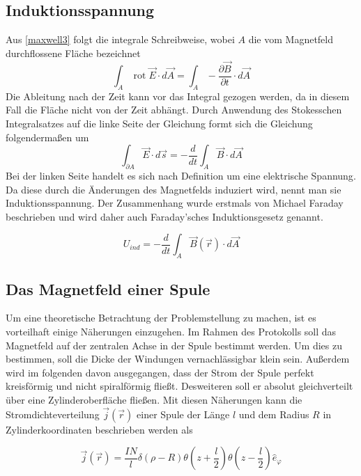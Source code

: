 \documentclass{article}
\begin{document}
\subsection{Induktionsspannung}
Aus \eqref{maxwell3} folgt die integrale Schreibweise, wobei \(A\) die vom Magnetfeld durchflossene Fläche bezeichnet
\begin{equation*}
\int_{A}\operatorname{rot} \vec{E} \cdot d\vec{A} =  
\int_{A} -\frac{\partial \vec{B}}{\partial t} \cdot d\vec{A}
\end{equation*}
Die Ableitung nach der Zeit kann vor das Integral gezogen werden, da in diesem Fall die Fläche nicht von der Zeit abhängt. Durch Anwendung des {\sc Stokesschen Integralsatzes} auf die linke Seite der Gleichung formt sich die Gleichung folgendermaßen um
\begin{equation*}
\int_{\partial A}\vec{E} \cdot d\vec{s} =  
-\frac{d}{dt} \int_{A} \vec{B} \cdot d\vec{A}
\end{equation*}
Bei der linken Seite handelt es sich nach Definition um eine {\sc elektrische Spannung}. Da diese durch die Änderungen des Magnetfelds induziert wird, nennt man sie Induktionsspannung. Der Zusammenhang wurde erstmals von Michael Faraday beschrieben und wird daher auch {\sc Faraday'sches Induktionsgesetz} genannt.

\begin{equation}\label{faraday}
U_{ind} =  
-\frac{d}{dt} \int_{A} \vec{B}(\vec{r}) \cdot d\vec{A}
\end{equation}

\subsection{Das Magnetfeld einer Spule}
Um eine theoretische Betrachtung der Problemstellung zu machen, ist es vorteilhaft einige Näherungen einzugehen. Im Rahmen des Protokolls soll das Magnetfeld auf der zentralen Achse in der Spule bestimmt werden. Um dies zu bestimmen, soll die Dicke der Windungen vernachlässigbar klein sein. Außerdem wird im folgenden davon ausgegangen, dass der Strom der Spule perfekt kreisförmig und nicht spiralförmig fließt. Desweiteren soll er absolut gleichverteilt über eine Zylinderoberfläche fließen. Mit diesen Näherungen kann die Stromdichteverteilung \( \vec{j}(\vec{r}) \) einer Spule der Länge \(l\) und dem Radius \(R\) in Zylinderkoordinaten beschrieben werden als

\begin{equation}
\vec{j}(\vec{r}) = \frac{IN}{l}\delta(\rho - R) \theta(z+\frac{l}{2}) \theta(z-\frac{l}{2}) \hat{e}_\varphi
\end{equation}
\end{document}
